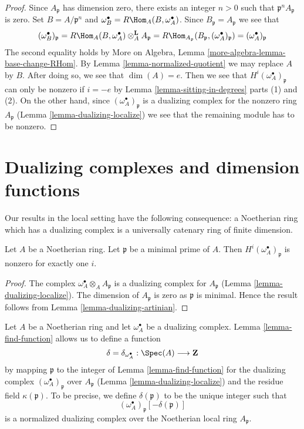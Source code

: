 \begin{proof}
Since $A_\mathfrak p$ has dimension zero, there exists an integer
$n > 0$ such that $\mathfrak p^nA_\mathfrak p$ is zero.
Set $B = A/\mathfrak p^n$ and
$\omega_B^\bullet = R\Hom_A(B, \omega_A^\bullet)$.
Since $B_\mathfrak p = A_\mathfrak p$ we see that
$$
(\omega_B^\bullet)_\mathfrak p =
R\Hom_A(B, \omega_A^\bullet) \otimes_A^\mathbf{L} A_\mathfrak p =
R\Hom_{A_\mathfrak p}(B_\mathfrak p, (\omega_A^\bullet)_\mathfrak p) =
(\omega_A^\bullet)_\mathfrak p
$$
The second equality holds by
More on Algebra, Lemma \ref{more-algebra-lemma-base-change-RHom}.
By Lemma \ref{lemma-normalized-quotient} we may replace $A$ by $B$.
After doing so, we see that $\dim(A) = e$. Then we see that
$H^i(\omega_A^\bullet)_\mathfrak p$ can only be nonzero if $i = -e$
by Lemma \ref{lemma-sitting-in-degrees} parts (1) and (2).
On the other hand, since $(\omega_A^\bullet)_\mathfrak p$
is a dualizing complex for the nonzero ring $A_\mathfrak p$
(Lemma \ref{lemma-dualizing-localize})
we see that the remaining module has to be nonzero.
\end{proof}





\section{Dualizing complexes and dimension functions}
\label{section-dimension-function}

\noindent
Our results in the local setting have the following consequence:
a Noetherian ring which has a dualizing complex is a
universally catenary ring of finite dimension.

\begin{lemma}
\label{lemma-nonvanishing-generically}
Let $A$ be a Noetherian ring. Let $\mathfrak p$ be a minimal prime
of $A$. Then $H^i(\omega_A^\bullet)_\mathfrak p$ is nonzero
for exactly one $i$.
\end{lemma}

\begin{proof}
The complex $\omega_A^\bullet \otimes_A A_\mathfrak p$
is a dualizing complex for $A_\mathfrak p$
(Lemma \ref{lemma-dualizing-localize}).
The dimension of $A_\mathfrak p$ is zero as $\mathfrak p$
is minimal. Hence the result follows from
Lemma \ref{lemma-dualizing-artinian}.
\end{proof}

\noindent
Let $A$ be a Noetherian ring and let $\omega_A^\bullet$ be a dualizing
complex. Lemma \ref{lemma-find-function} allows us to define a function
$$
\delta = \delta_{\omega_A^\bullet} : \Spec(A) \longrightarrow \mathbf{Z}
$$
by mapping $\mathfrak p$ to the integer of Lemma \ref{lemma-find-function}
for the dualizing complex $(\omega_A^\bullet)_\mathfrak p$
over $A_\mathfrak p$ (Lemma \ref{lemma-dualizing-localize})
and the residue field $\kappa(\mathfrak p)$. To be precise, we define
$\delta(\mathfrak p)$ to be the unique integer such that
$$
(\omega_A^\bullet)_\mathfrak p[-\delta(\mathfrak p)]
$$
is a normalized dualizing complex over the Noetherian local ring
$A_\mathfrak p$.

